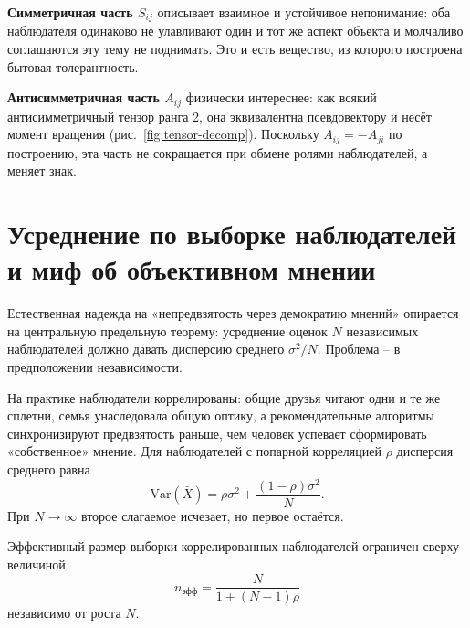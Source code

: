 \documentclass[11pt,a4paper]{article}
\begin{document}
\textbf{Симметричная часть $S_{ij}$} описывает взаимное и устойчивое непонимание: оба наблюдателя одинаково не улавливают один и тот же аспект объекта и молчаливо соглашаются эту тему не поднимать. Это и есть вещество, из которого построена бытовая толерантность.

\textbf{Антисимметричная часть $A_{ij}$} физически интереснее: как всякий антисимметричный тензор ранга 2, она эквивалентна псевдовектору и несёт момент вращения (рис.~\ref{fig:tensor-decomp}). Поскольку $A_{ij}=-A_{ji}$ по построению, эта часть не сокращается при обмене ролями наблюдателей, а меняет знак.

\section{Усреднение по выборке наблюдателей и миф об объективном мнении}

Естественная надежда на «непредвзятость через демократию мнений» опирается на центральную предельную теорему: усреднение оценок $N$ независимых наблюдателей должно давать дисперсию среднего $\sigma^2/N$. Проблема -- в предположении независимости.

На практике наблюдатели коррелированы: общие друзья читают одни и те же сплетни, семья унаследовала общую оптику, а рекомендательные алгоритмы синхронизируют предвзятость раньше, чем человек успевает сформировать «собственное» мнение. Для наблюдателей с попарной корреляцией $\rho$ дисперсия среднего равна
\[
\mathrm{Var}(\bar X) = \rho\sigma^2 + \frac{(1-\rho)\sigma^2}{N}.
\]
При $N\to\infty$ второе слагаемое исчезает, но первое остаётся.

\begin{theorem}
Эффективный размер выборки коррелированных наблюдателей ограничен сверху величиной
\[
n_{\text{эфф}} = \frac{N}{1+(N-1)\rho}
\]
независимо от роста $N$.
\end{theorem}
\end{document}
